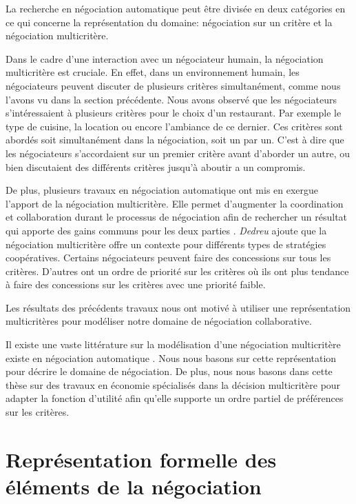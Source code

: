 La recherche en négociation automatique peut être divisée en deux catégories en ce qui concerne la représentation du domaine: négociation sur un critère et la négociation multicritère.  

Dans le cadre d'une interaction avec un négociateur humain, la négociation multicritère est cruciale. En effet, dans un environnement humain, les négociateurs peuvent discuter de plusieurs critères simultanément, comme nous l'avons vu dans la section précédente.  Nous avons observé que les négociateurs s'intéressaient à plusieurs critères pour le choix d'un restaurant. Par exemple le type de cuisine, la location ou encore l'ambiance de ce dernier. Ces critères sont abordés soit simultanément dans la négociation, soit un par un. C'est à dire que les négociateurs s'accordaient sur un premier critère avant d'aborder un autre, ou bien discutaient des différents critères jusqu'à aboutir a un compromis.

De plus, plusieurs travaux en négociation automatique ont mis en exergue l'apport de la négociation multicritère. Elle permet d'augmenter la coordination et collaboration durant le processus de négociation afin de rechercher un résultat qui apporte des gains communs pour les deux parties \cite{jonker2007agent,lai2008decentralized,lai2004literature}. \emph{Dedreu} \cite{de1995impact} ajoute que la négociation multicritère offre un contexte pour différents types de stratégies coopératives. Certains négociateurs peuvent faire des concessions sur tous les critères. D'autres ont un ordre de priorité sur les critères où ils ont plus tendance à faire des concessions sur les critères avec une priorité faible. 

Les résultats des précédents travaux nous ont motivé à utiliser une représentation multicritères pour modéliser notre domaine de négociation collaborative. 

Il existe une vaste littérature sur la modélisation d'une négociation multicritère existe en négociation automatique \cite{jonker2007agent,lai2008decentralized,lai2004literature,hindriks2008opponent,traum2008multi}. Nous nous basons sur cette représentation pour décrire le domaine de négociation.
De plus, nous nous basons dans cette thèse sur des travaux en économie spécialisés dans la décision multicritère \cite{greco2016multiple} pour adapter la fonction d'utilité afin qu'elle supporte un ordre partiel de préférences sur les critères.


\section{Représentation formelle des éléments de la négociation}

